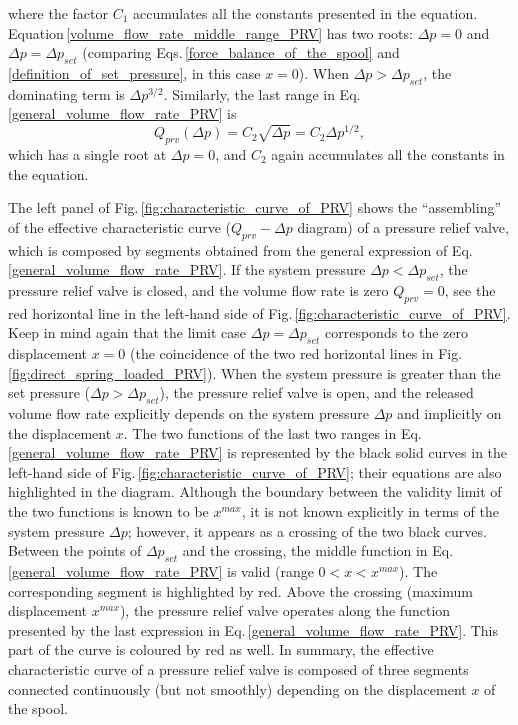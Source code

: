 %
where the factor $C_1$ accumulates all the constants presented in the equation. Equation\,\eqref{volume_flow_rate_middle_range_PRV} has two roots: $\Delta p=0$ and $\Delta p = \Delta p_{set}$ (comparing Eqs.\,\eqref{force_balance_of_the_spool} and \eqref{definition_of_set_pressure}, in this case $x=0$). When $\Delta p > \Delta p_{set}$, the dominating term is $\Delta p^{3/2}$. Similarly, the last range in Eq.\,\eqref{general_volume_flow_rate_PRV} is
%
\begin{equation}
Q_{prv}(\Delta p) = C_2 \sqrt{\Delta p} = C_2 \Delta p^{1/2},
\end{equation}
%
which has a single root at $\Delta p=0$, and $C_2$ again accumulates all the constants in the equation.

The left panel of Fig.\,\ref{fig:characteristic_curve_of_PRV} shows the ``assembling'' of the effective characteristic curve ($Q_{prv}-\Delta p$ diagram) of a pressure relief valve, which is composed by segments obtained from the general expression of Eq.\eqref{general_volume_flow_rate_PRV}. If the system pressure $\Delta p<\Delta p_{set}$, the pressure relief valve is closed, and the volume flow rate is zero $Q_{prv}=0$, see the red horizontal line in the left-hand side of Fig.\,\ref{fig:characteristic_curve_of_PRV}. Keep in mind again that the limit case $\Delta p=\Delta p_{set}$ corresponds to the zero displacement $x=0$ (the coincidence of the two red horizontal lines in Fig.\,\ref{fig:direct_spring_loaded_PRV}). When the system pressure is greater than the set pressure ($\Delta p>\Delta p_{set}$), the pressure relief valve is open, and the released volume flow rate explicitly depends on the system pressure $\Delta p$ and implicitly on the displacement $x$. The two functions of the last two ranges in Eq.\,\eqref{general_volume_flow_rate_PRV} is represented by the black solid curves in the left-hand side of Fig.\,\ref{fig:characteristic_curve_of_PRV}; their equations are also highlighted in the diagram. Although the boundary between the validity limit of the two functions is known to be $x^{max}$, it is not known explicitly in terms of the system pressure $\Delta p$; however, it appears as a crossing of the two black curves. Between the points of $\Delta p_{set}$ and the crossing, the middle function in Eq.\,\eqref{general_volume_flow_rate_PRV} is valid (range $0<x<x^{max}$). The corresponding segment is highlighted by red. Above the crossing (maximum displacement $x^{max}$), the pressure relief valve operates along the function presented by the last expression in Eq.\,\eqref{general_volume_flow_rate_PRV}. This part of the curve is coloured by red as well. In summary, the effective characteristic curve of a pressure relief valve is composed of three segments connected continuously (but not smoothly) depending on the displacement $x$ of the spool.

